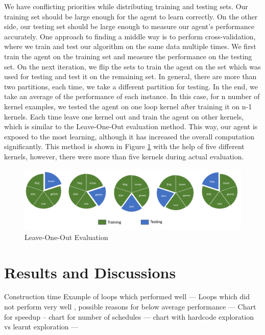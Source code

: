 \documentclass[logo,msc]{infthesis}           %
\begin{document}
We have conflicting priorities while distributing training and testing sets. Our training set should be large enough for the agent to learn correctly. On the other side, our testing set should be large enough to measure our agent's performance accurately. One approach to finding a middle way is to perform cross-validation, where we train and test our algorithm on the same data multiple times. We first train the agent on the training set and measure the performance on the testing set. On the next iteration, we flip the sets to train the agent on the set which was used for testing and test it on the remaining set. In general, there are more than two partitions, each time, we take a different partition for testing. In the end, we take an average of the performance of each instance. In this case, for n number of kernel examples, we tested the agent on one loop kernel after training it on n-1 kernels. Each time leave one kernel out and train the agent on other kernels, which is similar to the Leave-One-Out evaluation method. This way, our agent is exposed to the most learning, although it has increased the overall computation significantly. This method is shown in Figure \ref{fig:leave_one_out} with the help of five different kernels, however, there were more than five kernels during actual evaluation.

\begin{figure}[htbp]
  \centering
  \includegraphics[width=\textwidth]{Images/Leave_One_Out.png}   
  \caption{Leave-One-Out Evaluation}
  \label{fig:leave_one_out} 
\end{figure}

\chapter{Results and Discussions}
Construction time
Example of loops which performed well ---
Loops which did not perform very well , possible reasons for below average performance --- 
Chart for speedup -- 
chart for number of schedules ---
chart with hardcode exploration vs learnt exploration ---
\end{document}

